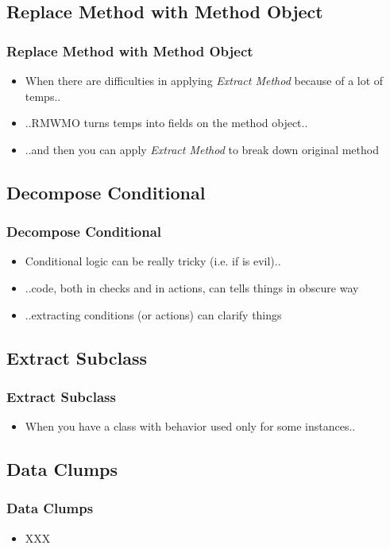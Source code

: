 \documentclass{beamer}
\begin{document}
\subsection{Replace Method with Method Object}
\begin{frame}
  \frametitle{Replace Method with Method Object}
  \begin{itemize}
	\item<+-> When there are difficulties in applying \textit{Extract Method} because of a lot of temps..
	\item<+-> ..RMWMO turns temps into fields on the method object.. 
	\item<+-> ..and then you can apply \textit{Extract Method} to break down original method
  \end{itemize}
\end{frame}

\subsection{Decompose Conditional}
\begin{frame}
  \frametitle{Decompose Conditional}
  \begin{itemize}
	\item<+-> Conditional logic can be really tricky (i.e. if is evil)..
	\item<+-> ..code, both in checks and in actions, can tells things in obscure way 
	\item<+-> ..extracting conditions (or actions) can clarify things
  \end{itemize}
\end{frame}

\subsection{Extract Subclass}
\begin{frame}
  \frametitle{Extract Subclass}
  \begin{itemize}
	\item<+-> When you have a class with behavior used only for some instances..
  \end{itemize}
\end{frame}

\subsection{Data Clumps}
\begin{frame}
  \frametitle{Data Clumps}
  \begin{itemize}
	\item<+-> XXX
  \end{itemize}
\end{frame}
\end{document}
